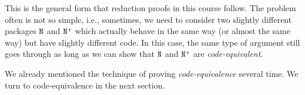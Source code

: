 This is the general form that reduction proofs in this course follow. The problem often is not so simple, i.e., sometimes, we need to consider two slightly different packages $\text{\texttt{N}}$ and $\text{\texttt{N'}}$ which actually behave in the same way (or almost the same way) but have slightly different code. In this case, the same type of argument still goes through as long as we can show that $\text{\texttt{N}}$ and $\text{\texttt{N'}}$ are \emph{code-equivalent}. 
\fi

We already mentioned the technique of proving \emph{code-equivalence} several time. We turn to code-equivalence in the next section.
